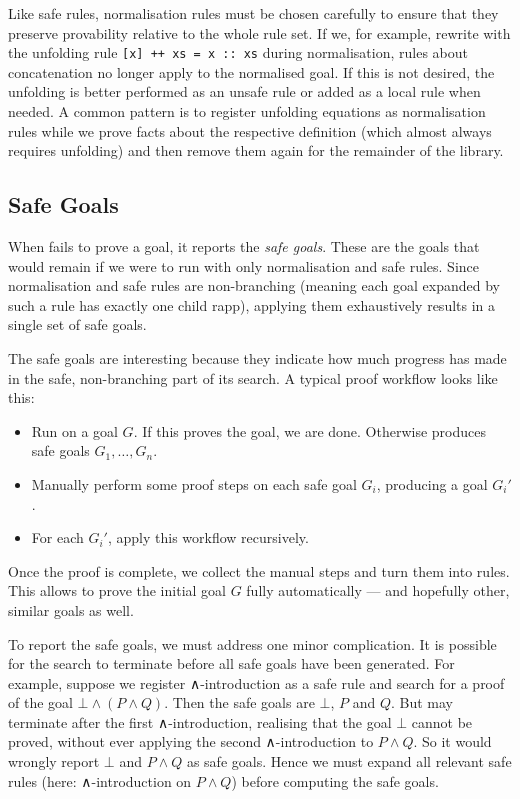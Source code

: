 Like safe rules, normalisation rules must be chosen carefully to ensure that
they preserve provability relative to the whole rule set. If we, for example,
rewrite with the unfolding rule \texttt{[x] ++ xs = x :: xs} during
normalisation, rules about concatenation no longer apply to the normalised goal.
If this is not desired, the unfolding is better performed as an unsafe rule or
added as a local rule when needed. A common pattern is to register unfolding
equations as normalisation rules while we prove facts about the respective
definition (which almost always requires unfolding) and then remove them again
for the remainder of the library.


\subsection{Safe Goals}%
\label{sec:safe-prefix}

When \Aesop{} fails to prove a goal, it reports the \emph{safe goals}. These are
the goals that would remain if we were to run \Aesop{} with only normalisation
and safe rules. Since normalisation and safe rules are non-branching (meaning
each goal expanded by such a rule has exactly one child rapp), applying them
exhaustively results in a single set of safe goals.

The safe goals are interesting because they indicate how much progress \Aesop{}
has made in the safe, non-branching part of its search. A typical \Aesop{} proof
workflow looks like this:
\begin{itemize}
  \item Run \Aesop{} on a goal $G$. If this proves the goal, we are done.
        Otherwise \Aesop{} produces safe goals $G_{1}, \dots, G_{n}$.
  \item Manually perform some proof steps on each safe goal $G_{i}$, producing
        a goal $G_{i}'$.
  \item For each $G_{i}'$, apply this workflow recursively.
\end{itemize}
Once the proof is complete, we collect the manual steps and turn them into
\Aesop{} rules. This allows \Aesop{} to prove the initial goal $G$ fully
automatically --- and hopefully other, similar goals as well.

To report the safe goals, we must address one minor complication. It is possible
for the search to terminate before all safe goals have been generated. For
example, suppose we register ∧-introduction as a safe rule and search for a
proof of the goal $⊥ ∧ (P ∧ Q)$. Then the safe goals are $⊥$, $P$ and $Q$. But
\Aesop{} may terminate after the first ∧-introduction, realising that the goal
$⊥$ cannot be proved, without ever applying the second ∧-introduction to
$P ∧ Q$. So it would wrongly report $⊥$ and $P ∧ Q$ as safe goals. Hence we must
expand all relevant safe rules (here: ∧-introduction on $P ∧ Q$) before
computing the safe goals.


